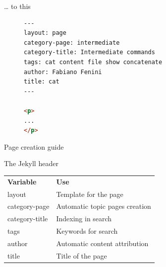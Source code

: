 \documentclass[10pt]{beamer}
\begin{document}
\begin{frame}[fragile]{… to this}
\begin{figure}[h]
\begin{lstlisting}[language=html]
---
layout: page
category-page: intermediate
category-title: Intermediate commands
tags: cat content file show concatenate
author: Fabiano Fenini
title: cat
---

<p>
...
</p>
\end{lstlisting}
\end{figure}
\end{frame}


\begin{frame}{Page creation guide}
\vfill{}\vfill
\end{frame}


\begin{frame}{The Jekyll header}
\begin{table}[h]
\begin{tabular}{l l}
\textbf{Variable} & \textbf{Use} \\
layout & Template for the page\\
category-page & Automatic topic pages creation\\
category-title & Indexing in search\\
tags & Keywords for search\\
author & Automatic content attribution\\
title & Title of the page\\
\end{tabular}
\end{table}
\end{frame}


\begin{frame}[standout]
\end{frame}
\end{document}
